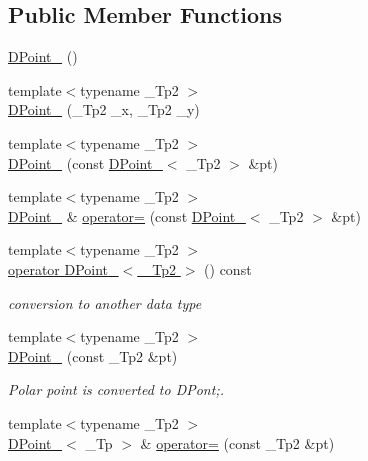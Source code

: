\subsection*{Public Member Functions}
\begin{DoxyCompactItemize}
\item 
\hyperlink{classnubot_1_1DPoint___a82622aabc9ef100392046e4958b1b83f}{D\-Point\-\_\-} ()
\item 
{\footnotesize template$<$typename \-\_\-\-Tp2 $>$ }\\\hyperlink{classnubot_1_1DPoint___a030116dca85c88e0de3d8317a55a2637}{D\-Point\-\_\-} (\-\_\-\-Tp2 \-\_\-x, \-\_\-\-Tp2 \-\_\-y)
\item 
{\footnotesize template$<$typename \-\_\-\-Tp2 $>$ }\\\hyperlink{classnubot_1_1DPoint___a17a6e62f32b273e0479fc5dd8ff92b8f}{D\-Point\-\_\-} (const \hyperlink{classnubot_1_1DPoint__}{D\-Point\-\_\-}$<$ \-\_\-\-Tp2 $>$ \&pt)
\item 
{\footnotesize template$<$typename \-\_\-\-Tp2 $>$ }\\\hyperlink{classnubot_1_1DPoint__}{D\-Point\-\_\-} \& \hyperlink{classnubot_1_1DPoint___ab02f88b6c61cca13f525f359a908e046}{operator=} (const \hyperlink{classnubot_1_1DPoint__}{D\-Point\-\_\-}$<$ \-\_\-\-Tp2 $>$ \&pt)
\item 
{\footnotesize template$<$typename \-\_\-\-Tp2 $>$ }\\\hyperlink{classnubot_1_1DPoint___a4b3b4c935b0ad734f6e5652c7e075df3}{operator D\-Point\-\_\-$<$ \-\_\-\-Tp2 $>$} () const 
\begin{DoxyCompactList}\small\item\em conversion to another data type \end{DoxyCompactList}\item 
{\footnotesize template$<$typename \-\_\-\-Tp2 $>$ }\\\hyperlink{classnubot_1_1DPoint___aa102c670ff71765242c21a7094991fe9}{D\-Point\-\_\-} (const \-\_\-\-Tp2 \&pt)
\begin{DoxyCompactList}\small\item\em Polar point is converted to D\-Pont;. \end{DoxyCompactList}\item 
{\footnotesize template$<$typename \-\_\-\-Tp2 $>$ }\\\hyperlink{classnubot_1_1DPoint__}{D\-Point\-\_\-}$<$ \-\_\-\-Tp $>$ \& \hyperlink{classnubot_1_1DPoint___a6d59bbe1a5038e8fcf9cbd434b894453}{operator=} (const \-\_\-\-Tp2 \&pt)
\item 

\end{DoxyCompactItemize}
